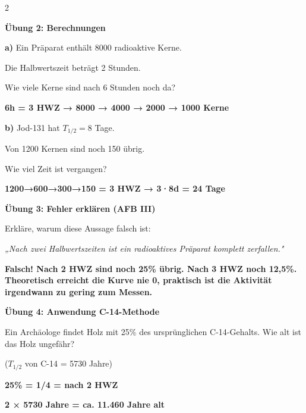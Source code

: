 \documentclass[10pt, a4paper]{article}
\newcommand{\fachfarbe}{physik}
\newcommand{\lsg}[1]{\textcolor{loesung}{\textbf{#1}}}
\newcommand{\abschnitt}[1]{%
    \vspace{8pt}\noindent\textbf{\textcolor{\fachfarbe}{#1}}\vspace{4pt}
}
\begin{document}
\begin{multicols}{2}
\vspace{8pt}


\abschnitt{Übung 2: Berechnungen}

\textbf{a)} Ein Präparat enthält 8000 radioaktive Kerne.

Die Halbwertszeit beträgt 2 Stunden.

Wie viele Kerne sind nach 6 Stunden noch da?

\vspace{4pt}
\lsg{6h = 3 HWZ → 8000 → 4000 → 2000 → 1000 Kerne}

\vspace{6pt}

\textbf{b)} Jod-131 hat $T_{1/2} = 8$ Tage.

Von 1200 Kernen sind noch 150 übrig.

Wie viel Zeit ist vergangen?

\vspace{4pt}
\lsg{1200→600→300→150 = 3 HWZ → 3·8d = 24 Tage}

\vspace{8pt}


\abschnitt{Übung 3: Fehler erklären (AFB III)}

\begin{fehlerbox}
Erkläre, warum diese Aussage falsch ist:

\vspace{4pt}

\textit{„Nach zwei Halbwertszeiten ist ein radioaktives Präparat komplett zerfallen."}

\vspace{4pt}
\lsg{Falsch! Nach 2 HWZ sind noch 25\% übrig. Nach 3 HWZ noch 12,5\%. Theoretisch erreicht die Kurve nie 0, praktisch ist die Aktivität irgendwann zu gering zum Messen.}
\end{fehlerbox}

\vspace{8pt}


\abschnitt{Übung 4: Anwendung C-14-Methode}

Ein Archäologe findet Holz mit 25\% des ursprünglichen C-14-Gehalts. Wie alt ist das Holz ungefähr?

($T_{1/2}$ von C-14 = 5730 Jahre)

\vspace{4pt}
\lsg{25\% = 1/4 = nach 2 HWZ}

\vspace{4pt}
\lsg{2 × 5730 Jahre = ca. 11.460 Jahre alt}

\end{multicols}
\end{document}
